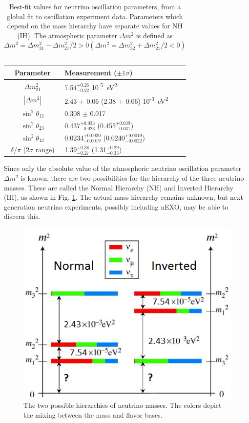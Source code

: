 \begin{table}[!htbp]
\caption{Best-fit values for neutrino oscillation parameters, from a global fit to oscillation experiment data.   Parameters which depend on the mass hierarchy have separate values for NH (IH).  The atmospheric parameter $\Delta m^{2}$ is defined as $\Delta m^{2} = \Delta m_{31}^{2} - \Delta m_{21}^{2}/2 > 0 (\Delta m^{2} = \Delta m_{32}^{2} + \Delta m_{21}^{2}/2 < 0)$. \cite{ReviewNuMass}} %
\label{table:nu_osc_vals}
\begin{tabular}{c|l}
Parameter & Measurement ($\pm 1 \sigma$) \\
\hline
$\Delta m_{21}^{2}$ & 7.54$^{+0.26}_{-0.22}$ 10\textsuperscript{-5}~eV\textsuperscript{2}\\
$|\Delta m^{2}|$ & 2.43 $\pm$ 0.06 (2.38 $\pm$ 0.06) 10\textsuperscript{-3}~eV\textsuperscript{2}\\
$\sin^{2} \theta_{12}$ & 0.308 $\pm$ 0.017\\
$\sin^{2} \theta_{23}$ & 0.437$^{+0.033}_{-0.023}$ (0.455$^{+0.039}_{-0.031}$)\\
$\sin^{2} \theta_{13}$ & 0.0234$^{+0.0020}_{-0.0019}$ (0.0240$^{+0.0019}_{-0.0022}$)\\
$\delta / \pi$ (2$\sigma$ range)& 1.39$^{+0.38}_{-0.27}$ (1.31$^{+0.29}_{-0.33}$)\\
\end{tabular}
\end{table}

Since only the absolute value of the atmospheric neutrino oscillation parameter $\Delta m^{2}$ is known, there are two possibilities for the hierarchy of the three neutrino masses.  These are called the Normal Hierarchy (NH) and Inverted Hierarchy (IH), as shown in Fig. \ref{fig:numasshier}.  The actual mass hierarchy remains unknown, but next-generation neutrino experiments, possibly including nEXO, may be able to discern this.

\begin{figure} %
        \centering
                \includegraphics[width=.5\textwidth]{figures/hierarchy_alterred.png}
                \caption{The two possible hierarchies of neutrino masses.  The colors depict the mixing between the mass and flavor bases.}
\label{fig:numasshier}
\end{figure}

